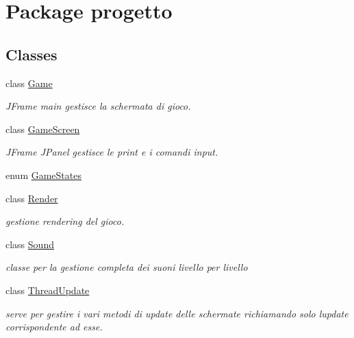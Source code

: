 \hypertarget{namespaceprogetto}{}\section{Package progetto}
\label{namespaceprogetto}
\subsection*{Classes}
\begin{DoxyCompactItemize}
\item 
class \hyperlink{classprogetto_1_1_game}{Game}
\begin{DoxyCompactList}\small\item\em J\+Frame main gestisce la schermata di gioco. \end{DoxyCompactList}\item 
class \hyperlink{classprogetto_1_1_game_screen}{Game\+Screen}
\begin{DoxyCompactList}\small\item\em J\+Frame J\+Panel gestisce le print e i comandi input. \end{DoxyCompactList}\item 
enum \hyperlink{enumprogetto_1_1_game_states}{Game\+States}
\item 
class \hyperlink{classprogetto_1_1_render}{Render}
\begin{DoxyCompactList}\small\item\em gestione rendering del gioco. \end{DoxyCompactList}\item 
class \hyperlink{classprogetto_1_1_sound}{Sound}
\begin{DoxyCompactList}\small\item\em classe per la gestione completa dei suoni livello per livello \end{DoxyCompactList}\item 
class \hyperlink{classprogetto_1_1_thread_update}{Thread\+Update}
\begin{DoxyCompactList}\small\item\em serve per gestire i vari metodi di update delle schermate richiamando solo l\textquotesingle{}update corrispondente ad esse. \end{DoxyCompactList}\end{DoxyCompactItemize}
